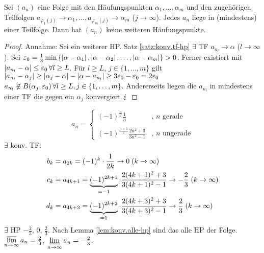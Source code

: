 \documentclass[12pt]{scrreprt}
\begin{document}
\begin{lem}
  \label{lem:konv.alle-hp}
  Sei $(a_n)$ eine Folge mit den Häufungspunkten $\alpha_1,\dotsc,\alpha_m$ und den
  zugehörigen Teilfolgen
  $a_{\varphi_1(j)}\to\alpha_1,\dotsc,a_{\varphi_m(j)}\to\alpha_m$
  ($j\to\infty$). Jedes $a_n$ liege in (mindestens) einer Teilfolge. Dann hat
  $(a_n)$ keine weiteren Häufungspunkte.
\end{lem}
\begin{proof}
  Annahme: Sei \kmplx{\alpha} ein weiterer HP. Satz
  \ref{satz:konv.tf-hp} \folgt $\exists$ TF $a_{n_l}\to\alpha$
  ($l\to\infty$). Sei $\varepsilon_0 = \frac13 \min{\{\left\lvert\alpha-\alpha_1\right\lvert,
    \left\lvert\alpha-\alpha_2\right\lvert, \dotsc, \left\lvert\alpha-\alpha_m\right\lvert\}} >
  0$. Ferner existiert  mit
  $\left\lvert a_{n_l}-\alpha\right\lvert\le\varepsilon_0\,\forall l\ge L$. \folgt Für $l\ge L$,
  $j\in\{1,\dotsc,m\}$ gilt $\left\lvert a_{n_l}-\alpha_j\right\lvert \ge
  \left\lvert\alpha_j-\alpha\right\lvert-\left\lvert\alpha-a_{n_l}\right\lvert \ge 3\varepsilon_0-\varepsilon_0 =
  2\varepsilon_0$ \folgt $a_{n_l} \not\in B(\alpha_j, \varepsilon_0)\,\forall l\ge L,
  j\in\{1,\dotsc,m\}$. Andererseits liegen die $a_{n_l}$ in mindestens
  einer TF die gegen ein $\alpha_j$ konvergiert \folgt $\lightning$
\end{proof}

\begin{bsp}
  \label{bsp:konv.bw}
  \[a_n = \begin{cases}
    \left(-1\right)^{\frac{n}{2}}\frac1n &\text{, } n \text{ gerade} \\\;\\
    \left(-1\right)^{\frac{n+1}{2}}\frac{2n^2+3}{3n^2-1} &\text{, } n
    \text{ ungerade} \end{cases} \] $\exists$ konv. TF:
  \begin{align*}
    b_k &= a_{2k} = (-1)^k \cdot \frac{1}{2k} \to 0 \; (k\rightarrow\infty) \\
    c_k &= a_{4k+1} = \underbrace{(-1)^{2k+1}}_{=-1} \cdot \frac{2(4k+1)^2+3}{3(4k+1)^2-1} \to -\frac23 \; (k\rightarrow\infty) \\
    d_k &= a_{4k+3} = \underbrace{(-1)^{2k+2}}_{=1} \cdot
    \frac{2(4k+3)^2+3}{3(4k+3)^2-1} \to \frac23 \; (k\rightarrow\infty)
  \end{align*}
  \folgt $\exists$ HP $-\frac23$, $0$, $\frac23$. Nach Lemma \ref{lem:konv.alle-hp} sind das alle HP der Folge.\\
  \folgtnach{\ref{thm:konv.bw}} $\varlimsup\limits_{n\rightarrow\infty}{a_n}=\frac23$,
  $\varliminf\limits_{n\rightarrow\infty}{a_n}=-\frac23$.
\end{bsp}
\end{document}
